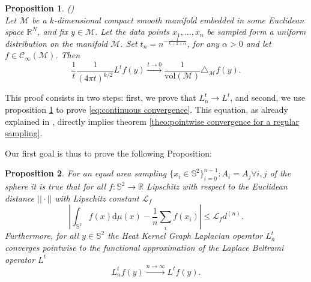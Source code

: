 \documentclass{article} %
\newtheorem{prop}{Proposition}
\begin{document}
\begin{prop} (\cite{belkin2005towards}) \\
Let $\mathcal M$ be a $k$-dimensional compact smooth manifold embedded in some Euclidean space $\mathbb R^N$, and fix $y\in\mathcal M$. Let the data points $x_1, \dots, x_n$ be sampled form a uniform distribution on the manifold $\mathcal M$. Set $t_n=n^{-\frac{1}{k+2+\alpha}}$, for any $\alpha>0$ and let $f\in\mathcal C_\infty(\mathcal M)$. Then
	$$\frac{1}{t}\frac{1}{(4\pi t)^{k/2}} L^tf(y) \xrightarrow{t\to 0 } \frac{1}{\text{vol}(\mathcal M)}\triangle_{\mathcal M}f(y).$$
	\label{prop:3}
\end{prop}

This proof consists in two steps: first, we prove that $L_n^t \rightarrow L^t$, and second, we use proposition \ref{prop:3} to prove \eqref{eq:continuous convergence}. This equation, as already explained in \cite{belkin2007convergence}, directly implies theorem \ref{theo:pointwise convergence for a regular sampling}.

Our first goal is thus to prove the following Proposition:
\vspace{0.5cm}
\begin{prop}\label{prop:1}
	For an equal area sampling $\{x_i\in\mathbb S^2\}_{i=0}^{n-1}: A_i=A_j \forall i,j$ of the sphere it is true that for all $f: \mathbb S^2 \rightarrow \mathbb R$ Lipschitz with respect to the Euclidean distance $||\cdot||$ with Lipschitz constant $\mathcal L_f$
	$$
	\left| \int_{\mathbb S^2}f({ x})\text{d}{\mu(x)} - \frac{1}{n}\sum_i f( x_i)\right|\leq \mathcal L_fd^{(n)}.
	$$
	Furthermore, for all $y\in\mathbb S^2$ the Heat Kernel Graph Laplacian operator $L^t_n$ converges pointwise to the functional approximation of the Laplace Beltrami operator $L^t$
	$$ L_n^tf(y)\xrightarrow{n\to\infty} L^tf(y).$$
\end{prop}
\vspace{0.5cm}
\end{document}
